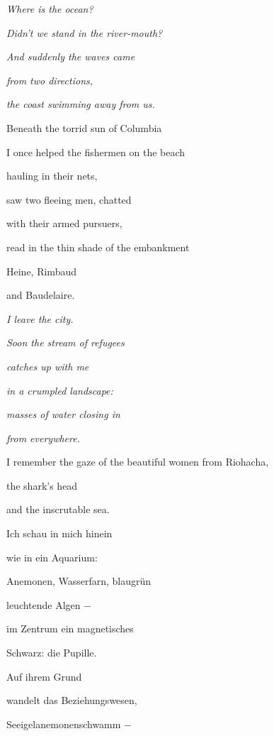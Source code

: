 \emph{
Where is the ocean?}

\emph{
Didn't we stand in the river-mouth?}

\emph{
And suddenly the waves came}

\emph{
from two directions,}

\emph{
the coast swimming away from us.}


\bigskip

Beneath the torrid sun of Columbia

I once helped the fishermen on the beach 

hauling in their nets,


\bigskip

saw two fleeing men, chatted

with their armed pursuers,


\bigskip

read in the thin shade of the embankment

Heine, Rimbaud

and Baudelaire.


\bigskip

\emph{
I leave the city.}

\emph{
Soon the stream of refugees}

\emph{
catches up with me}

\emph{
in a crumpled landscape:}

\emph{
masses of water closing in}

\emph{
from everywhere.}


\bigskip

I remember the gaze of the beautiful women from Riohacha,

the shark's head

and the inscrutable sea.


\bigskip



\bigskip

Ich schau in mich hinein

wie in ein Aquarium:

Anemonen, Wasserfarn, blaugrün

leuchtende Algen $-$

im Zentrum ein magnetisches 

Schwarz: die Pupille.


\bigskip

Auf ihrem Grund

wandelt das Beziehungswesen,

Seeigelanemonenschwamm $-$

